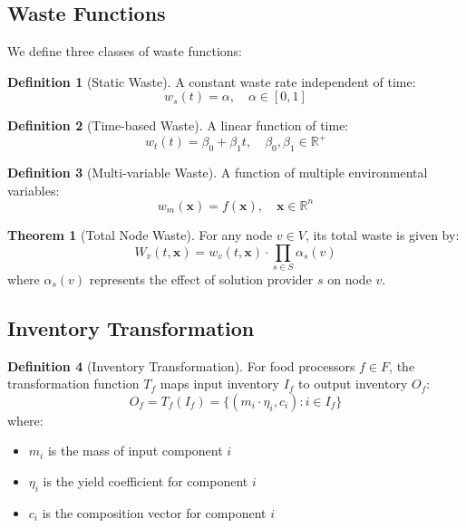 \documentclass[12pt]{article}
\theoremstyle{definition}
\newtheorem{definition}{Definition}
\newtheorem{theorem}{Theorem}
\begin{document}
\subsection{Waste Functions}
We define three classes of waste functions:

\begin{definition}[Static Waste]
A constant waste rate independent of time:
\begin{equation}
    w_s(t) = \alpha, \quad \alpha \in [0,1]
\end{equation}
\end{definition}

\begin{definition}[Time-based Waste]
A linear function of time:
\begin{equation}
    w_t(t) = \beta_0 + \beta_1t, \quad \beta_0, \beta_1 \in \mathbb{R}^+
\end{equation}
\end{definition}

\begin{definition}[Multi-variable Waste]
A function of multiple environmental variables:
\begin{equation}
    w_m(\mathbf{x}) = f(\mathbf{x}), \quad \mathbf{x} \in \mathbb{R}^n
\end{equation}
\end{definition}

\begin{theorem}[Total Node Waste]
For any node $v \in V$, its total waste is given by:
\begin{equation}
    W_v(t, \mathbf{x}) = w_v(t, \mathbf{x}) \cdot \prod_{s \in S} \alpha_s(v)
\end{equation}
where $\alpha_s(v)$ represents the effect of solution provider $s$ on node $v$.
\end{theorem}

\subsection{Inventory Transformation}
\begin{definition}[Inventory Transformation]
For food processors $f \in F$, the transformation function $T_f$ maps input inventory $I_f$ to output inventory $O_f$:
\begin{equation}
    O_f = T_f(I_f) = \{(m_i \cdot \eta_i, c_i) : i \in I_f\}
\end{equation}
where:
\begin{itemize}
    \item $m_i$ is the mass of input component $i$
    \item $\eta_i$ is the yield coefficient for component $i$
    \item $c_i$ is the composition vector for component $i$
\end{itemize}
\end{definition}
\end{document}
